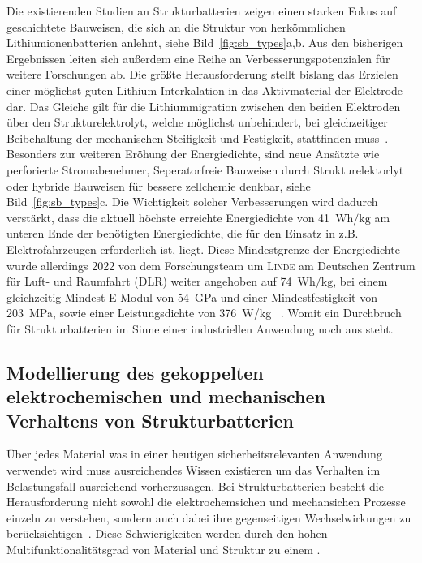 Die existierenden Studien an Strukturbatterien zeigen einen starken Fokus auf geschichtete Bauweisen, die sich an die Struktur von herkömmlichen Lithiumionenbatterien anlehnt, siehe Bild~\ref{fig:sb_types}a,b. Aus den bisherigen Ergebnissen leiten sich außerdem eine Reihe an Verbesserungspotenzialen für weitere Forschungen ab. Die größte Herausforderung stellt bislang das Erzielen einer möglichst guten Lithium-Interkalation in das Aktivmaterial der Elektrode dar. Das Gleiche gilt für die Lithiummigration zwischen den beiden Elektroden über den Strukturelektrolyt, welche möglichst unbehindert, bei gleichzeitiger Beibehaltung der mechanischen Steifigkeit und Festigkeit,  stattfinden muss~\cite{Asp2015}. Besonders zur weiteren Eröhung der Energiedichte, sind neue Ansätzte wie perforierte Stromabenehmer, Seperatorfreie Bauweisen durch Strukturelektorlyt oder hybride Bauweisen für bessere zellchemie denkbar, siehe Bild~\ref{fig:sb_types}c. Die Wichtigkeit solcher Verbesserungen wird dadurch verstärkt, dass die aktuell höchste erreichte Energiedichte von 41~$\si{\watt \hour \per \kg}$ am unteren Ende der benötigten Energiedichte, die für den Einsatz in z.B. Elektrofahrzeugen erforderlich ist, liegt. Diese Mindestgrenze der Energiedichte wurde allerdings 2022 von dem Forschungsteam um \textsc{Linde} am Deutschen Zentrum für Luft- und Raumfahrt (DLR) weiter angehoben auf 74~$\si{\watt \hour \per \kg}$, bei einem gleichzeitig Mindest-E-Modul von 54~GPa und einer Mindestfestigkeit von 203~MPa, sowie einer Leistungsdichte von 376~W/kg ~\cite{Ishfaq2022}. Womit ein Durchbruch für Strukturbatterien im Sinne einer industriellen Anwendung noch aus steht.

\subsection*{Modellierung des gekoppelten elektrochemischen und mechanischen Verhaltens von Strukturbatterien}

Über jedes Material was in einer heutigen sicherheitsrelevanten Anwendung verwendet wird muss ausreichendes Wissen existieren um das Verhalten im Belastungsfall ausreichend vorherzusagen. Bei Strukturbatterien besteht die Herausforderung nicht sowohl die elektrochemsichen und mechansichen Prozesse einzeln zu verstehen, sondern auch dabei ihre gegenseitigen Wechselwirkungen zu berücksichtigen~\cite{Carlstedt2022a}. Diese Schwierigkeiten werden durch den hohen Multifunktionalitätsgrad von Material und Struktur zu einem .


